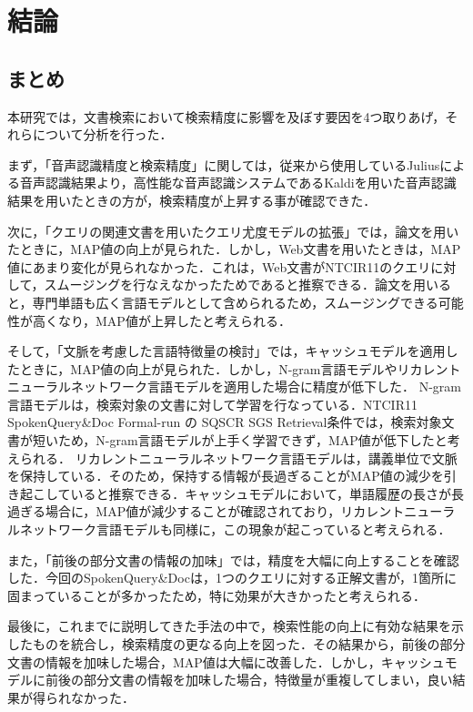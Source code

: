 
\chapter{結論} 
\section{まとめ}
本研究では，文書検索において検索精度に影響を及ぼす要因を4つ取りあげ，それらについて分析を行った．

まず，「音声認識精度と検索精度」に関しては，従来から使用しているJuliusによる音声認識結果より，高性能な音声認識システムであるKaldiを用いた音声認識結果を用いたときの方が，検索精度が上昇する事が確認できた．

次に，「クエリの関連文書を用いたクエリ尤度モデルの拡張」では，論文を用いたときに，MAP値の向上が見られた．しかし，Web文書を用いたときは，MAP値にあまり変化が見られなかった．これは，Web文書がNTCIR11のクエリに対して，スムージングを行なえなかったためであると推察できる．論文を用いると，専門単語も広く言語モデルとして含められるため，スムージングできる可能性が高くなり，MAP値が上昇したと考えられる．

そして，「文脈を考慮した言語特徴量の検討」では，キャッシュモデルを適用したときに，MAP値の向上が見られた．しかし，N-gram言語モデルやリカレントニューラルネットワーク言語モデルを適用した場合に精度が低下した．
N-gram言語モデルは，検索対象の文書に対して学習を行なっている．NTCIR11 SpokenQuery\&Doc Formal-run の SQSCR SGS Retrieval条件では，検索対象文書が短いため，N-gram言語モデルが上手く学習できず，MAP値が低下したと考えられる．
リカレントニューラルネットワーク言語モデルは，講義単位で文脈を保持している．そのため，保持する情報が長過ぎることがMAP値の減少を引き起こしていると推察できる．キャッシュモデルにおいて，単語履歴の長さが長過ぎる場合に，MAP値が減少することが確認されており，リカレントニューラルネットワーク言語モデルも同様に，この現象が起こっていると考えられる．

また，「前後の部分文書の情報の加味」では，精度を大幅に向上することを確認した．今回のSpokenQuery\&Docは，1つのクエリに対する正解文書が，1箇所に固まっていることが多かったため，特に効果が大きかったと考えられる．

最後に，これまでに説明してきた手法の中で，検索性能の向上に有効な結果を示したものを統合し，検索精度の更なる向上を図った．その結果から，前後の部分文書の情報を加味した場合，MAP値は大幅に改善した．しかし，キャッシュモデルに前後の部分文書の情報を加味した場合，特徴量が重複してしまい，良い結果が得られなかった．

